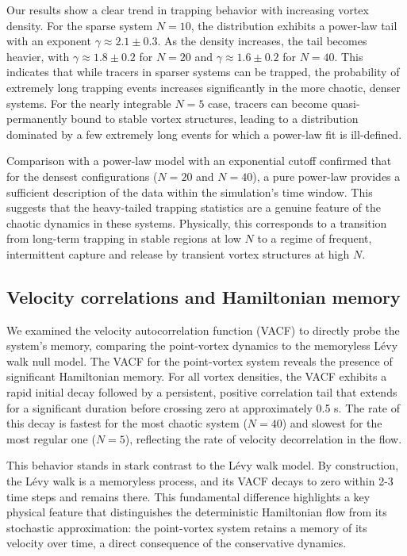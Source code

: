 \documentclass[]{article}
\begin{document}
Our results show a clear trend in trapping behavior with increasing vortex density. For the sparse system $N=10$, the distribution exhibits a power-law tail with an exponent $\gamma \approx 2.1 \pm 0.3$. As the density increases, the tail becomes heavier, with $\gamma \approx 1.8 \pm 0.2$ for $N=20$ and $\gamma \approx 1.6 \pm 0.2$ for $N=40$. This indicates that while tracers in sparser systems can be trapped, the probability of extremely long trapping events increases significantly in the more chaotic, denser systems. For the nearly integrable $N=5$ case, tracers can become quasi-permanently bound to stable vortex structures, leading to a distribution dominated by a few extremely long events for which a power-law fit is ill-defined.

Comparison with a power-law model with an exponential cutoff confirmed that for the densest configurations ($N=20$ and $N=40$), a pure power-law provides a sufficient description of the data within the simulation's time window. This suggests that the heavy-tailed trapping statistics are a genuine feature of the chaotic dynamics in these systems. Physically, this corresponds to a transition from long-term trapping in stable regions at low $N$ to a regime of frequent, intermittent capture and release by transient vortex structures at high $N$.

\subsection{Velocity correlations and Hamiltonian memory}

We examined the velocity autocorrelation function (VACF) to directly probe the system's memory, comparing the point-vortex dynamics to the memoryless L\'evy walk null model. The VACF for the point-vortex system reveals the presence of significant Hamiltonian memory. For all vortex densities, the VACF exhibits a rapid initial decay followed by a persistent, positive correlation tail that extends for a significant duration before crossing zero at approximately 0.5 s. The rate of this decay is fastest for the most chaotic system ($N=40$) and slowest for the most regular one ($N=5$), reflecting the rate of velocity decorrelation in the flow.

This behavior stands in stark contrast to the L\'evy walk model. By construction, the L\'evy walk is a memoryless process, and its VACF decays to zero within 2-3 time steps and remains there. This fundamental difference highlights a key physical feature that distinguishes the deterministic Hamiltonian flow from its stochastic approximation: the point-vortex system retains a memory of its velocity over time, a direct consequence of the conservative dynamics.
\end{document}
